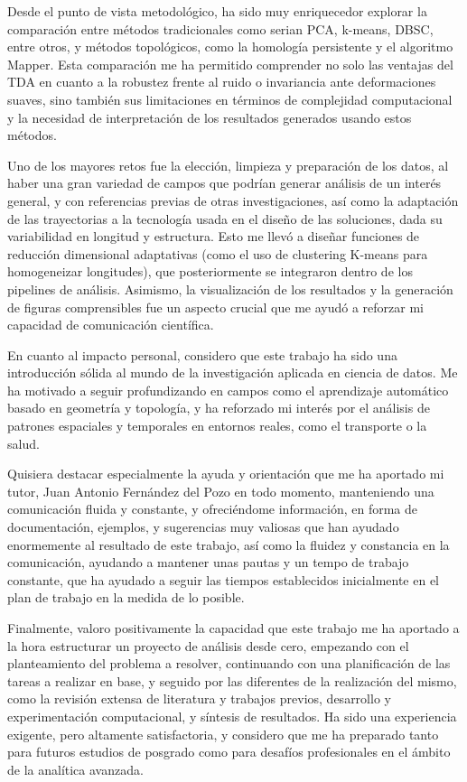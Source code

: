 Desde el punto de vista metodológico, ha sido muy enriquecedor explorar la comparación entre métodos tradicionales como serian PCA, k-means, DBSC, entre otros, y métodos topológicos, como la homología persistente y el algoritmo Mapper. Esta comparación me ha permitido comprender no solo las ventajas del TDA en cuanto a la robustez frente al ruido o invariancia ante deformaciones suaves, sino también sus limitaciones en términos de complejidad computacional y la necesidad de interpretación de los resultados generados usando estos métodos.

Uno de los mayores retos fue la elección, limpieza y preparación de los datos, al haber una gran variedad de campos que podrían generar análisis de un interés general, y con referencias previas de otras investigaciones, así como la adaptación de las trayectorias a la tecnología usada en el diseño de las soluciones, dada su variabilidad en longitud y estructura. Esto me llevó a diseñar funciones de reducción dimensional adaptativas (como el uso de clustering K-means para homogeneizar longitudes), que posteriormente se integraron dentro de los pipelines de análisis. Asimismo, la visualización de los resultados y la generación de figuras comprensibles fue un aspecto crucial que me ayudó a reforzar mi capacidad de comunicación científica.

En cuanto al impacto personal, considero que este trabajo ha sido una introducción sólida al mundo de la investigación aplicada en ciencia de datos. Me ha motivado a seguir profundizando en campos como el aprendizaje automático basado en geometría y topología, y ha reforzado mi interés por el análisis de patrones espaciales y temporales en entornos reales, como el transporte o la salud. 

Quisiera destacar especialmente la ayuda y orientación que me ha aportado mi tutor, Juan Antonio Fernández del Pozo en todo momento, manteniendo una comunicación fluida y constante, y ofreciéndome información, en forma de documentación, ejemplos, y sugerencias muy valiosas que han ayudado enormemente al resultado de este trabajo, así como la fluidez y constancia en la comunicación, ayudando a mantener unas pautas y un tempo de trabajo constante, que ha ayudado a seguir las tiempos establecidos inicialmente en el plan de trabajo en la medida de lo posible.

Finalmente, valoro positivamente la capacidad que este trabajo me ha aportado a la hora estructurar un proyecto de análisis desde cero, empezando con el planteamiento del problema a resolver, continuando con una planificación de las tareas a realizar en base, y seguido por las diferentes de la realización del mismo, como la revisión extensa de literatura y trabajos previos, desarrollo y experimentación computacional, y síntesis de resultados. Ha sido una experiencia exigente, pero altamente satisfactoria, y considero que me ha preparado tanto para futuros estudios de posgrado como para desafíos profesionales en el ámbito de la analítica avanzada. 

